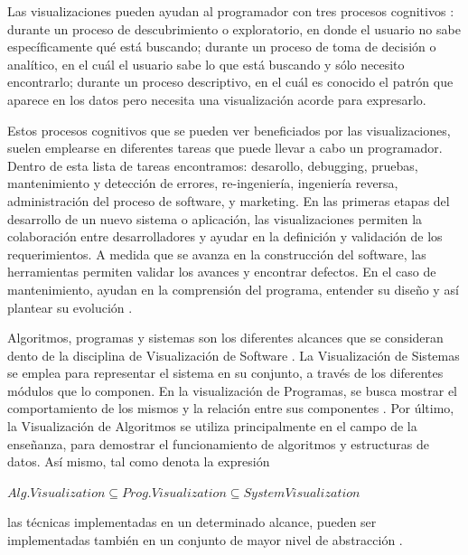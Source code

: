 Las visualizaciones pueden ayudan al programador con tres procesos cognitivos
\cite{ButlerAlmond93}:
durante un proceso de descubrimiento o exploratorio, en donde el usuario no
sabe específicamente qué está buscando;
durante un proceso de toma de decisión o analítico, en el cuál el usuario sabe lo que
está buscando y sólo necesito encontrarlo;
durante un proceso descriptivo, en el cuál es conocido el patrón que aparece en los
datos pero necesita una visualización acorde para expresarlo.

Estos procesos cognitivos que se pueden ver beneficiados por las visualizaciones, suelen
emplearse en diferentes tareas que puede llevar a cabo un programador.
Dentro de esta lista de tareas \cite{MalleticMarcusCollard02} encontramos: desarollo,
debugging, pruebas, mantenimiento y detección de errores, re-ingeniería, ingeniería reversa,
administración del proceso de software, y marketing.
En las primeras etapas del desarrollo de un nuevo sistema o aplicación, las visualizaciones
permiten la colaboración entre desarrolladores y ayudar en la definición y validación de los
requerimientos.
A medida que se avanza en la construcción del software, las herramientas permiten validar
los avances y encontrar defectos.
En el caso de mantenimiento, ayudan en la comprensión del programa, entender su diseño y
así plantear su evolución \cite{PetreDeQuincey06}.

Algoritmos, programas y sistemas son los diferentes alcances que se consideran
dento de la disciplina de Visualización de Software \cite{PriceBaeckerSmall93,Myers90}.
La Visualización de Sistemas se emplea para representar el sistema en su conjunto,
a través de los diferentes módulos que lo componen.
En la visualización de Programas, se busca mostrar el comportamiento de los mismos
y la relación entre sus componentes \cite{BenAri01}.
Por último, la Visualización de Algoritmos se utiliza principalmente en el campo de la enseñanza,
para demostrar el funcionamiento de algoritmos y estructuras de datos.
Así mismo, tal como denota la expresión 
\begin{center}
    $Alg. Visualization \subseteq Prog. Visualization \subseteq System Visualization$
\end{center}
las técnicas implementadas en un determinado alcance, pueden ser implementadas
también en un conjunto de mayor nivel de abstracción \cite{BeronHenriquesPereiraUzal07}.

